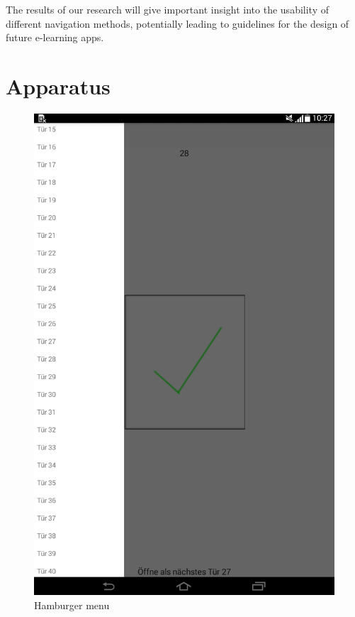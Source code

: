 \documentclass{sig-alternate-05-2015}
\begin{document}
The results of our research will give important insight into the usability of
different navigation methods, potentially leading to guidelines for the design
of future e-learning apps.

\section{Apparatus}

\begin{figure}
	\centering
	\includegraphics[width=0.7\linewidth]{pics/screenshots/burger3}
	\caption{Hamburger menu}
	\label{fig:burger3}
\end{figure}
\end{document}
